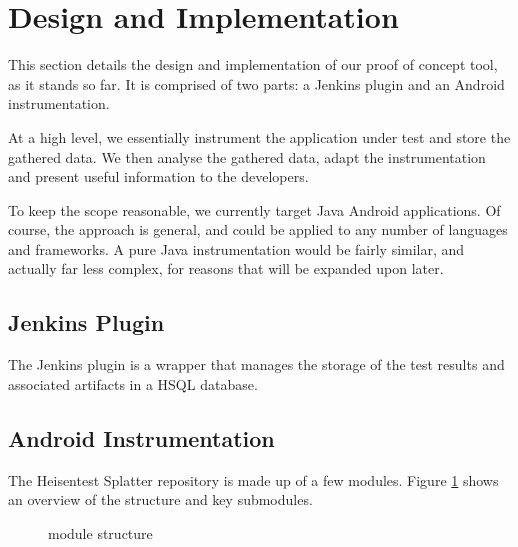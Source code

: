 \section{Design and Implementation}
\label{sec:imp}

This section details the design and implementation of our proof of concept tool,
as it stands so far. It is comprised of two parts: a Jenkins plugin and an
Android instrumentation.

At a high level, we essentially instrument the application under test and store
the gathered data. We then analyse the gathered data, adapt the instrumentation
and present useful information to the developers.

To keep the scope reasonable, we currently target Java Android applications. Of
course, the approach is general, and could be applied to any number of languages
and frameworks. A pure Java instrumentation would be fairly similar, and
actually far less complex, for reasons that will be expanded upon later.


\subsection{Jenkins Plugin}

The Jenkins plugin is a wrapper that manages the storage of the test results and
associated artifacts in a HSQL database.


\subsection{Android Instrumentation}

The Heisentest Splatter repository\cite{heisentestInstrumentation} is made up of
a few modules. Figure \ref{fig:repo_structure} shows an overview of the
structure and key submodules.

\begin{figure}[h]
\caption{\heisentest module structure}
\label{fig:repo_structure}
\end{figure}


